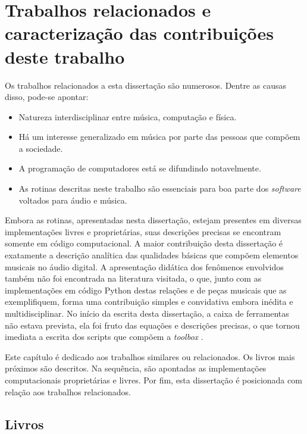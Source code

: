 \chapter{Trabalhos relacionados e caracterização das contribuições deste trabalho}
\label{cap:trabalhosRelacionados}

Os trabalhos relacionados a esta dissertação são numerosos. Dentre as causas disso, pode-se apontar:

\begin{itemize}
    \item Natureza interdisciplinar entre música, computação e física.
    \item Há um interesse generalizado em música por parte das pessoas que compõem a sociedade.
    \item A programação de computadores está se difundindo notavelmente.
    \item As rotinas descritas neste trabalho são essenciais para boa parte dos \emph{software} voltados para áudio e música.
\end{itemize}

Embora as rotinas, apresentadas nesta dissertação, estejam presentes em diversas implementações livres e proprietárias, suas descrições precisas se encontram somente em código computacional. A maior contribuição desta dissertação é exatamente a descrição analítica das qualidades básicas que compõem elementos musicais no áudio digital. A apresentação didática dos fenômenos envolvidos também não foi encontrada na literatura visitada, o que, junto com as implementações em código Python destas relações e de peças musicais que as exemplifiquem, forma uma contribuição simples e convidativa embora inédita e multidisciplinar. No início da escrita desta dissertação, a caixa de ferramentas não estava prevista, ela foi fruto das equações e descrições precisas, o que tornou imediata a escrita dos scripts que compõem a \emph{toolbox} \massa.

Este capítulo é dedicado aos trabalhos similares ou relacionados. Os livros mais próximos são descritos. Na sequência, são apontadas as implementações computacionais proprietárias e livres. Por fim, esta dissertação é posicionada com relação aos trabalhos relacionados.

\section{Livros}\label{subsec:livros}

